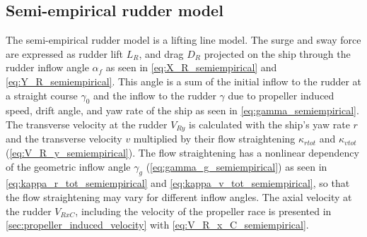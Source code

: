 \subsection{Semi-empirical rudder model}
\label{sec:semiempirical_rudder_model}
The semi-empirical rudder model is a lifting line model. The surge and sway force are expressed as rudder lift $L_R$, and drag $D_R$ projected on the ship through the rudder inflow angle $\alpha_f$ as seen in \autoref{eq:X_R_semiempirical} and \autoref{eq:Y_R_semiempirical}.
This angle is a sum of the initial inflow to the rudder at a straight course $\gamma_0$ and the inflow to the rudder $\gamma$ due to propeller induced speed, drift angle, and yaw rate of the ship as seen in \autoref{eq:gamma_semiempirical}.
\begin{equation}
    \label{eq:X_R_semiempirical}
    
\end{equation}
%
\begin{equation}
    \label{eq:Y_R_semiempirical}
    
\end{equation}
%
\begin{equation}
    \label{eq:alpha_f_semiempirical}
    
\end{equation}
%
\begin{equation}
    \label{eq:gamma_semiempirical}
    
\end{equation}
The transverse velocity at the rudder $V_{Ry}$ is calculated with the ship's yaw rate $r$ and the transverse velocity $v$ multiplied by their flow straightening $\kappa_{rtot}$ and $\kappa_{vtot}$ (\autoref{eq:V_R_y_semiempirical}). The flow straightening has a nonlinear dependency of the geometric inflow angle $\gamma_g$ (\autoref{eq:gamma_g_semiempirical}) as seen in \autoref{eq:kappa_r_tot_semiempirical} and \autoref{eq:kappa_v_tot_semiempirical}, so that the flow straightening may vary for different inflow angles.
The axial velocity at the rudder $V_{RxC}$, including the velocity of the propeller race is presented in \autoref{sec:propeller_induced_velocity} with \autoref{eq:V_R_x_C_semiempirical}.
\begin{equation}
    \label{eq:V_R_y_semiempirical}
    
\end{equation}
%
\begin{equation}
    \label{eq:kappa_r_tot_semiempirical}
    
\end{equation}
%
\begin{equation}
    \label{eq:kappa_v_tot_semiempirical}
    
\end{equation}
%
\begin{equation}
    \label{eq:gamma_g_semiempirical}
    
\end{equation}

